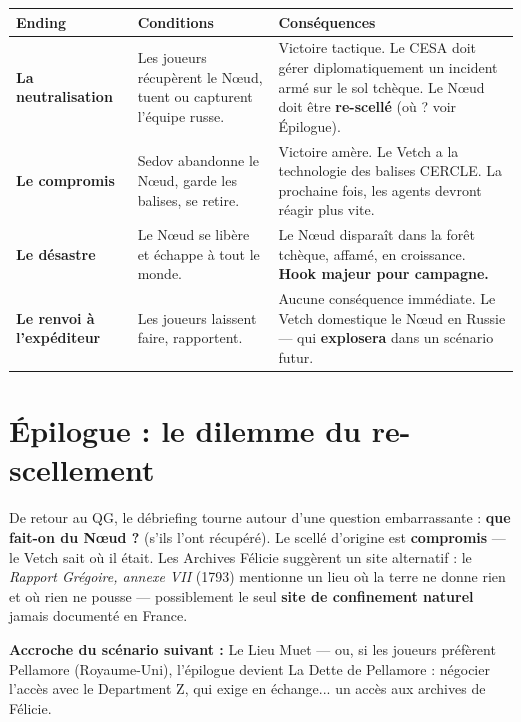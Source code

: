 \documentclass[10pt,a5paper,twoside]{book}
\begin{document}
\begin{center}
\begin{tabular}{|P{3.0cm}|P{3.0cm}|P{6.0cm}|}
\hline
\textbf{Ending} & \textbf{Conditions} & \textbf{Conséquences} \\
\hline
\textbf{La neutralisation} & Les joueurs récupèrent le Nœud, tuent ou capturent l'équipe russe. & Victoire tactique. Le CESA doit gérer diplomatiquement un incident armé sur le sol tchèque. Le Nœud doit être \textbf{re-scellé} (où ? voir Épilogue). \\
\hline
\textbf{Le compromis} & Sedov abandonne le Nœud, garde les balises, se retire. & Victoire amère. Le Vetch a la technologie des balises CERCLE. La prochaine fois, les agents devront réagir plus vite. \\
\hline
\textbf{Le désastre} & Le Nœud se libère et échappe à tout le monde. & Le Nœud disparaît dans la forêt tchèque, affamé, en croissance. \textbf{Hook majeur pour campagne.} \\
\hline
\textbf{Le renvoi à l'expéditeur} & Les joueurs laissent faire, rapportent. & Aucune conséquence immédiate. Le Vetch domestique le Nœud en Russie --- qui \textbf{explosera} dans un scénario futur. \\
\hline
\end{tabular}
\end{center}

\section{Épilogue : le dilemme du re-scellement}

De retour au QG, le débriefing tourne autour d'une question embarrassante : \textbf{que fait-on du Nœud ?} (s'ils l'ont récupéré). Le scellé d'origine est \textbf{compromis} --- le Vetch sait où il était. Les Archives Félicie suggèrent un site alternatif : le \textit{Rapport Grégoire, annexe VII} (1793) mentionne un lieu \og où la terre ne donne rien et où rien ne pousse \fg{} --- possiblement le seul \textbf{site de confinement naturel} jamais documenté en France.

\begin{shaded}
\textbf{Accroche du scénario suivant :} \og Le Lieu Muet \fg{} --- ou, si les joueurs préfèrent Pellamore (Royaume-Uni), l'épilogue devient \og La Dette de Pellamore \fg{} : négocier l'accès avec le Department Z, qui exige en échange... un accès aux archives de Félicie.
\end{shaded}
\end{document}
